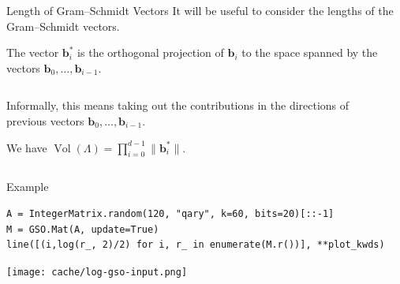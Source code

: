 \documentclass[table,10pt,aspectratio=169]{beamer}
\DeclareMathOperator{\Vol}{Vol}
\renewcommand{\vec}[1]{\ensuremath{\mathbf{#1}}\xspace}
\begin{document}
\begin{frame}[label={sec:orge7ce25d}]{Length of Gram--Schmidt Vectors}
It will be useful to consider the lengths of the Gram--Schmidt vectors.

The vector \(\vec{b}^*_i\) is the orthogonal projection of \(\vec{b}_i\) to the space spanned by the vectors \(\vec{b}_0, \ldots, \vec{b}_{i-1}\).

\begin{columns}
\begin{column}{0.45\columnwidth}
\vspace{1em}

Informally, this means taking out the contributions in the directions of previous vectors  \(\vec{b}_0, \ldots, \vec{b}_{i-1}\).

\vspace{1em}

We have \(\Vol(\Lambda) = \prod_{i=0}^{d-1} \|\vec{b}_{i}^{*}\|\).
\end{column}

\begin{column}{0.45\columnwidth}
\end{column}
\end{columns}
\end{frame}

\begin{frame}[label={sec:orgcbd8949},fragile]{Example}
 \lstset{language=Python,label= ,caption= ,captionpos=b,numbers=none}
\begin{lstlisting}
A = IntegerMatrix.random(120, "qary", k=60, bits=20)[::-1]
M = GSO.Mat(A, update=True)
line([(i,log(r_, 2)/2) for i, r_ in enumerate(M.r())], **plot_kwds)
\end{lstlisting}

\begin{center}
\texttt{[image: cache/log-gso-input.png]}
\end{center}
\end{frame}
\end{document}
